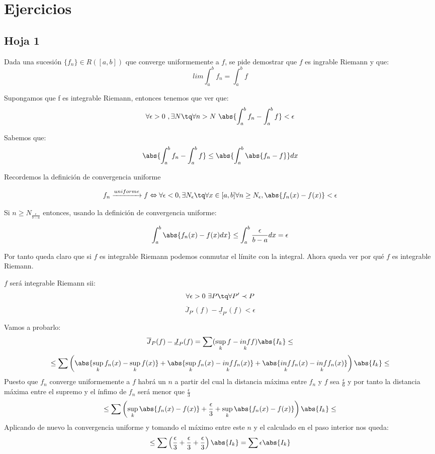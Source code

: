 \section{Ejercicios}
\subsection{Hoja 1}
\begin{problem}[5]
Dada una sucesión $\lbrace f_n \rbrace \in R([a,b])$ que converge uniformemente a $f$, se pide demostrar que $f$ es ingrable Riemann y que:
\[ lim \int_{a}^{b} f_n = \int_{a}^{b} f \]

\solution
Supongamos que f es integrable Riemann, entonces tenemos que ver que:
\[ \forall \epsilon > 0 \ , \exists N \tq \forall n> N \ \abs{\int_a^b f_n - \int_a^b f} < \epsilon\]

Sabemos que:
\[\abs{\int_a^b f_n - \int_a^b f} \leq \abs{\int_a^b \abs{f_n -f}} dx\]

Recordemos la definición de convergencia uniforme

\begin{defn}
\[f_n \xrightarrow{uniforme} f \Leftrightarrow \forall \epsilon < 0, \exists N_{\epsilon} \tq \forall x \in [a,b]  \forall n \geq N_{\epsilon}, \abs{f_n (x) - f(x)} < \epsilon\]
\end{defn}

Si $n \geq N_{\frac{\epsilon}{b-a}}$ entonces, usando la definición de convergencia uniforme:

\[\int_a^b \abs{f_n(x) - f(x) dx} \leq \int_a^b \frac{\epsilon}{b-a}dx = \epsilon\]

Por tanto queda claro que si $f$ es integrable Riemann podemos conmutar el límite con la integral. Ahora queda ver por qué $f$ es integrable Riemann.

$f$ será integrable Riemann sii:
\[\forall \epsilon > 0 \ \exists P \tq \forall P' \prec P \]
\[\overline{J}_{P'}(f) - \underline{J}_{P'}(f) < \epsilon\]

Vamos a probarlo:
\[\overline{J}_P(f) - \underline{J}_P(f) = \sum(\sup_k f - \underset{k}{inf} f)\abs{I_k} \leq\]
\[\leq \sum\left( \abs{\sup_{k}f_n(x) - \sup_{k}f(x)} + \abs{\sup_{k}f_n(x) - \underset{k}{inf}f_n(x)} +  \abs{\underset{k}{inf}f_n(x) - \underset{k}{inf}f_n(x)} \right)\abs{I_k} \leq \]
Puesto que $f_n$ converge uniformemente a $f$ habrá un $n$ a partir del cual la distancia máxima entre $f_n$ y $f$ sea $\frac{\epsilon}{6}$ y por tanto la distancia máxima entre el supremo y el ínfimo de $f_n$ será menor que $\frac{\epsilon}{3}$
\[\leq \sum\left( \sup_{k} \abs{f_n(x) - f(x)} + \frac{\epsilon}{3} + \sup_k \abs{f_n(x) - f(x)} \right)\abs{I_k} \leq\]
Aplicando de nuevo la convergencia uniforme y tomando el máximo entre este $n$ y el calculado en el paso interior nos queda:
\[\leq \sum \left(\frac{\epsilon}{3} + \frac{\epsilon}{3} + \frac{\epsilon}{3} \right)\abs{I_k} = \sum\epsilon\abs{I_k}\]


\end{problem}
